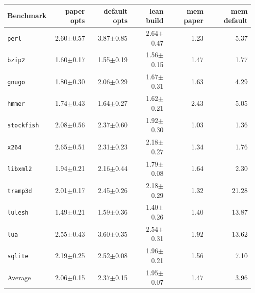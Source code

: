 \begin{tabular}{lrrrrr}
\toprule
Benchmark & paper opts & default opts & lean build & mem paper & mem default \\
\midrule
\texttt{perl} & 2.60$\pm$0.57 & 3.87$\pm$0.85 & 2.64$\pm$0.47 & 1.23 & 5.37 \\
\texttt{bzip2} & 1.60$\pm$0.17 & 1.55$\pm$0.19 & 1.56$\pm$0.15 & 1.47 & 1.77 \\
\texttt{gnugo} & 1.80$\pm$0.30 & 2.06$\pm$0.29 & 1.67$\pm$0.31 & 1.63 & 4.29 \\
\texttt{hmmer} & 1.74$\pm$0.43 & 1.64$\pm$0.27 & 1.62$\pm$0.21 & 2.43 & 5.05 \\
\texttt{stockfish} & 2.08$\pm$0.56 & 2.37$\pm$0.60 & 1.92$\pm$0.30 & 1.03 & 1.36 \\
\texttt{x264} & 2.65$\pm$0.51 & 2.31$\pm$0.23 & 2.18$\pm$0.27 & 1.34 & 1.76 \\
\texttt{libxml2} & 1.94$\pm$0.21 & 2.16$\pm$0.44 & 1.79$\pm$0.08 & 1.64 & 2.30 \\
\texttt{tramp3d} & 2.01$\pm$0.17 & 2.45$\pm$0.26 & 2.18$\pm$0.29 & 1.32 & 21.28 \\
\texttt{lulesh} & 1.49$\pm$0.21 & 1.59$\pm$0.36 & 1.40$\pm$0.26 & 1.40 & 13.87 \\
\texttt{lua} & 2.55$\pm$0.43 & 3.60$\pm$0.35 & 2.54$\pm$0.31 & 1.92 & 13.62 \\
\texttt{sqlite} & 2.19$\pm$0.25 & 2.52$\pm$0.08 & 1.96$\pm$0.21 & 1.56 & 7.10 \\
\midrule
Average & 2.06$\pm$0.15 & 2.37$\pm$0.15 & 1.95$\pm$0.07 & 1.47 & 3.96 \\
\bottomrule
\end{tabular}
